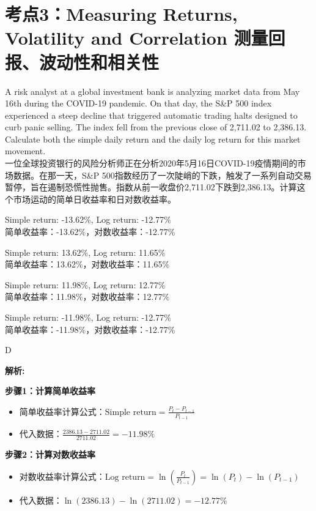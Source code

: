 \documentclass{article}
\newcounter{question} %
\newenvironment{explanation}
{\textbf{解析:}\par}
{\par}
\begin{document}
\section{考点3：Measuring Returns, Volatility and Correlation 测量回报、波动性和相关性}
\setcounter{question}{0}


\begin{question}
A risk analyst at a global investment bank is analyzing market data from May 16th during the COVID-19 pandemic. On that day, the S\&P 500 index experienced a steep decline that triggered automatic trading halts designed to curb panic selling. The index fell from the previous close of 2,711.02 to 2,386.13. Calculate both the simple daily return and the daily log return for this market movement.\\
一位全球投资银行的风险分析师正在分析2020年5月16日COVID-19疫情期间的市场数据。在那一天，S\&P 500指数经历了一次陡峭的下跌，触发了一系列自动交易暂停，旨在遏制恐慌性抛售。指数从前一收盘价2,711.02下跌到2,386.13。计算这个市场运动的简单日收益率和日对数收益率。
\end{question}

\begin{choices}
    \item Simple return: -13.62\%, Log return: -12.77\%\\
    简单收益率：-13.62\%，对数收益率：-12.77\%
    \item Simple return: 13.62\%, Log return: 11.65\%\\
    简单收益率：13.62\%，对数收益率：11.65\%
    \item Simple return: 11.98\%, Log return: 12.77\%\\
    简单收益率：11.98\%，对数收益率：12.77\%
    \item Simple return: -11.98\%, Log return: -12.77\%\\
    简单收益率：-11.98\%，对数收益率：-12.77\%
\end{choices}

\begin{correctanswer}
D
\end{correctanswer}

\begin{explanation}
\textbf{步骤1：计算简单收益率}
\begin{itemize}
    \item 简单收益率计算公式：\(\text{Simple return} = \frac{P_t - P_{t-1}}{P_{t-1}}\)
    \item 代入数据：\(\frac{2386.13 - 2711.02}{2711.02} = -11.98\%\)
\end{itemize}

\textbf{步骤2：计算对数收益率}
\begin{itemize}
    \item 对数收益率计算公式：\(\text{Log return} = \ln(\frac{P_t}{P_{t-1}}) = \ln(P_t) - \ln(P_{t-1})\)
    \item 代入数据：\(\ln(2386.13) - \ln(2711.02) = -12.77\%\)
\end{itemize}
\end{explanation}
\end{document}
